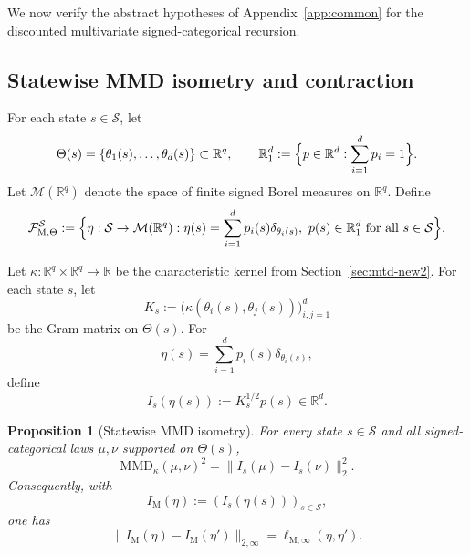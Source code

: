 \documentclass{article}
\newtheorem{proposition}[theorem]{Proposition}
\newcommand{\X}{\mathcal{S}}
\newcommand{\R}{\mathbb{R}}
\begin{document}
We now verify the abstract hypotheses of Appendix~\ref{app:common} for the discounted multivariate signed-categorical recursion.

\subsection{Statewise MMD isometry and contraction}

For each state $s\in \X$, let
\begin{equation}
\Theta(s)=\{\theta_1(s),\dots,\theta_d(s)\}\subset\mathbb R^q, \qquad \mathbb R_1^d := \Bigl\{ p\in\mathbb R^d : \sum_{i=1}^d p_i=1 \Bigr\}.
\end{equation}
Let $\mathcal M(\R^q)$ denote the space of finite signed Borel measures on $\R^q$. Define
\begin{equation}
\mathcal F^{\X}_{\mathrm M,\Theta} := \Bigl\{ \eta : \X\to \mathcal M(\mathbb R^q) : \eta(s)=\sum_{i=1}^d p_i(s)\delta_{\theta_i(s)}, \ p(s)\in \mathbb R_1^d \text{ for all }s\in \X \Bigr\}.
\end{equation}

Let $\kappa:\mathbb R^q\times\mathbb R^q\to\mathbb R$ be the characteristic kernel from Section~\ref{sec:mtd-new2}. For each state $s$, let
\begin{equation}
K_s := \bigl( \kappa(\theta_i(s),\theta_j(s)) \bigr)_{i,j=1}^d
\end{equation}
be the Gram matrix on $\Theta(s)$. For
\begin{equation}
\eta(s)=\sum_{i=1}^d p_i(s)\delta_{\theta_i(s)},
\end{equation}
define
\begin{equation}
I_s(\eta(s)) := K_s^{1/2}p(s)\in\mathbb R^d.
\end{equation}

\begin{proposition}[Statewise MMD isometry]
\label{prop:mtd-isometry}
For every state $s\in \X$ and all signed-categorical laws $\mu,\nu$ supported on $\Theta(s)$,
\begin{equation}
\mathrm{MMD}_\kappa(\mu,\nu)^2 = \lVert I_s(\mu)-I_s(\nu) \rVert_2^2.
\end{equation}
Consequently, with
\begin{equation}
I_{\mathrm M}(\eta):=(I_s(\eta(s)))_{s\in \X},
\end{equation}
one has
\begin{equation}
\lVert I_{\mathrm M}(\eta)-I_{\mathrm M}(\eta') \rVert_{2,\infty} = \ell_{\mathrm M,\infty}(\eta,\eta').
\end{equation}
\end{proposition}
\end{document}
